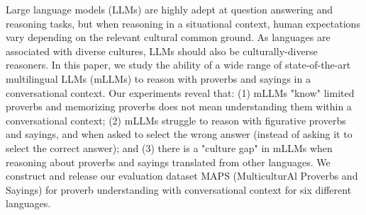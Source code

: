 Large language models (LLMs) are highly adept at question answering and reasoning tasks, but when reasoning in a situational context, human expectations vary depending on the relevant cultural common ground. As languages are associated with diverse cultures, LLMs should also be culturally-diverse reasoners. In this paper, we study the ability of a wide range of state-of-the-art multilingual LLMs (mLLMs) to reason with proverbs and sayings in a conversational context. Our experiments reveal that: (1) mLLMs "know" limited proverbs and memorizing proverbs does not mean understanding them within a conversational context; (2) mLLMs struggle to reason with figurative proverbs and sayings, and when asked to select the wrong answer (instead of asking it to select the correct answer); and (3) there is a "culture gap" in mLLMs when reasoning about proverbs and sayings translated from other languages. We construct and release our evaluation dataset MAPS (MulticulturAl Proverbs and Sayings) for proverb understanding with conversational context for six different languages.